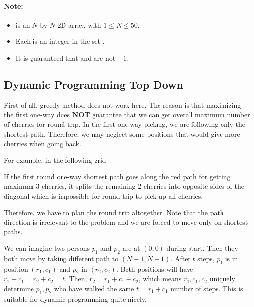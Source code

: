 \paragraph{Note:}

\begin{itemize}
\item {} is an $N$ by $N$ 2D array, with $1 \leq N \leq 50$.
\item Each  is an integer in the set \fcj{[-1, 0, 1]}.
\item It is guaranteed that  and  are not $-1$.
\end{itemize}

\subsection{Dynamic Programming Top Down}
First of all, greedy method does not work here. The reason is that maximizing the first one-way does \textbf{NOT} guarantee that we can get overall maximum number of cherries for round-trip. In the first one-way picking, we are following only the shortest path. Therefore, we may neglect some positions that would give more cherries when going back.
\par
For example, in the following grid
\begin{figure}[H]
\centering
{}
\end{figure}
If the first round one-way shortest path goes along the red path for getting maximum 3 cherries, it splits the remaining 2 cherries into opposite sides of the diagonal which is impossible for round trip to pick up all cherries. 

Therefore, we have to plan the round trip altogether. Note that the path direction is irrelevant to the problem and we are forced to move only on shortest paths.

We can imagine two persons $p_1$ and $p_2$ are at $(0,0)$ during start. Then they both move by taking different path to $(N-1, N-1)$. After $t$ steps, $p_1$ is in position $(r_1,c_1)$ and $p_2$ in $(r_2, c_2)$. Both positions will have $r_1+c_1=r_2+c_2=t$. Then, $r_2 = r_1 + c_1 - c_2$, which means $r_1,c_1,c_2$ uniquely determine $p_1, p_2$ who have walked the same $t = r_1+c_1$ number of steps. This is suitable for dynamic programming quite nicely.

